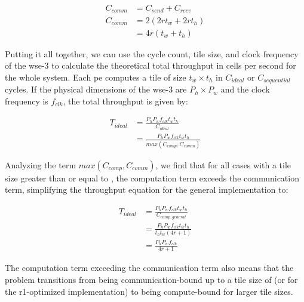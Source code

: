 \begin{equation}
    \label{eq:c_comm}
    \begin{aligned}
        C_{comm} &= C_{send} + C_{recv} \\[1ex]
        C_{comm} &= 2\left(2 r t_w + 2 r t_h\right) \\[1ex]
        &= 4r\left(t_w+t_h\right)
    \end{aligned}
\end{equation}

Putting it all together, we can use the cycle count, tile size, and clock frequency of the \ac{wse}-3 to calculate the theoretical total throughput in cells per second for the whole system. Each \ac{pe} computes a tile of size $t_w \times t_h$ in $C_{ideal}$ or $C_{sequential}$ cycles. If the physical dimensions of the \ac{wse}-3 are $P_h \times P_w$ and the clock frequency is $f_{clk}$, the total throughput is given by:

\begin{equation}
    \label{eq:throughput_ideal}
    \begin{aligned}
        T_{ideal} &= \frac{P_h P_w f_{clk} t_w t_h}{C_{ideal}} \\[1ex]
        &= \frac{P_h P_w f_{clk} t_w t_h}{max\left(C_{comp}, C_{comm}\right)}
    \end{aligned}
\end{equation}

Analyzing the term $max\left(C_{comp}, C_{comm}\right)$, we find that for all cases with a tile size greater than or equal to , the computation term exceeds the communication term, simplifying the throughput equation for the general implementation to:

\begin{equation}
    \label{eq:throughput_ideal_simplified}
    \begin{aligned}
        T_{ideal} &= \frac{P_h P_w f_{clk} t_w t_h}{C_{comp,general}} \\[1ex]
        &= \frac{P_h P_w f_{clk} t_w t_h}{t_h t_w \left(4r + 1\right)} \\[1ex]
        &= \frac{P_h P_w f_{clk}}{4r + 1}
    \end{aligned}
\end{equation}

The computation term exceeding the communication term also means that the problem transitions from being communication-bound up to a tile size of  (or  for the r1-optimized implementation) to being compute-bound for larger tile sizes.

